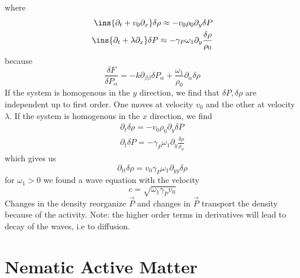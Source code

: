 where
\begin{align}
    \ins{\partial_t+v_0\partial_x}\delta\rho \approx -v_0\rho_0\partial_y\delta P \\
    \ins{\partial_t + \lambda\partial_x}\delta P \approx -\gamma_P\omega_1\partial_y\frac{\delta\rho}{\rho_0}
\end{align}
because
\begin{equation}
    \frac{\delta F}{\delta P_\alpha} = -k\partial_{\beta\beta}\delta P_\alpha + \frac{\omega_1}{\rho_0}\partial_\alpha\delta\rho
\end{equation}
If the system is homogenous in the \(y\) direction, we find that \(\delta P, \delta\rho\) are independent up to first order. One moves at velocity \(v_0\) and the other at velocity \(\lambda\). If the system is homogenous in the \(x\) direction, we find
\begin{align}
    \partial_t\delta\rho = -v_0\rho_0\partial_y\delta P \\
    \partial_t\delta P = -\gamma_P\omega_1\partial_y\frac{\delta\rho}{\rho_0}
\end{align}
which gives us
\begin{equation}
    \partial_{tt}\delta\rho = v_0\gamma_P\omega_1\partial_{yy}\delta\rho 
\end{equation}
for \(\omega_1 > 0\) we found a wave equation with the velocity 
\begin{equation}
    c = \sqrt{\omega_1\gamma_P v_0}
\end{equation}
Changes in the density reorganize \(\vec{P}\) and changes in \(\vec{P}\) transport the density because of the activity. Note: the higher order terms in derivatives will lead to decay of the waves, i.e to diffusion.
\newpage
\section{Nematic Active Matter}
